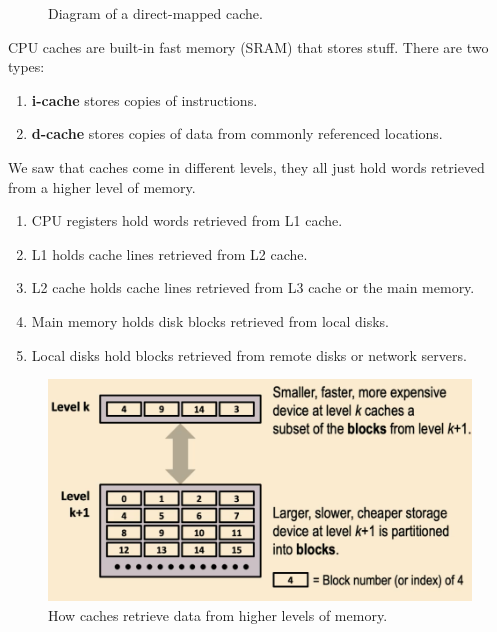 \begin{definition}
\begin{figure}[H]
      \caption{Diagram of a direct-mapped cache.} 
      \label{fig:direct_mapped_cache}
    \end{figure}
    CPU caches are built-in fast memory (SRAM) that stores stuff. There are two types: 
    \begin{enumerate}
      \item \textbf{i-cache} stores copies of instructions. 
      \item \textbf{d-cache} stores copies of data from commonly referenced locations. 
    \end{enumerate}
    We saw that caches come in different levels, they all just hold words retrieved from a higher level of memory. 
    \begin{enumerate}
      \item CPU registers hold words retrieved from L1 cache. 
      \item L1 holds cache lines retrieved from L2 cache. 
      \item L2 cache holds cache lines retrieved from L3 cache or the main memory.  
      \item Main memory holds disk blocks retrieved from local disks. 
      \item Local disks hold blocks retrieved from remote disks or network servers. 
    \end{enumerate}

    \begin{figure}[H]
      \centering 
      \includegraphics[scale=0.4]{img/cache_retrieve.png}
      \caption{How caches retrieve data from higher levels of memory.} 
      \label{fig:cache_retrieve}
    \end{figure}
  \end{definition}

